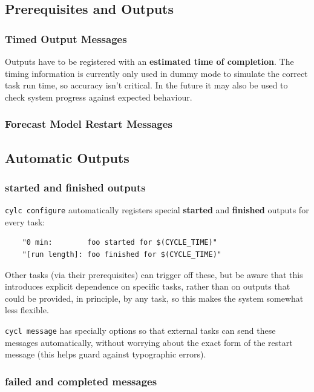 \documentclass[11pt,a4paper]{article}
\begin{document}
\pagebreak
\subsection{Prerequisites and Outputs} 
\label{PrerequisitesandOutputs}

\subsubsection{Timed Output Messages}

Outputs have to be registered with an {\bf estimated time of completion}.
The timing information is currently only used in dummy mode to simulate
the correct task run time, so accuracy isn't critical. In the future
it may also be used to check system progress against expected behaviour.


\subsubsection{Forecast Model Restart Messages}

\subsection{Automatic Outputs}

\subsubsection{started and finished outputs}

\lstinline=cylc configure= automatically registers special {\bf started}
and {\bf finished} outputs for every task: 

\begin{lstlisting}
    "0 min:        foo started for $(CYCLE_TIME)"
    "[run length]: foo finished for $(CYCLE_TIME)"
\end{lstlisting}

Other tasks (via their prerequisites) can trigger off these, but 
be aware that this introduces explicit dependence on specific tasks,
rather than on outputs that could be provided, in principle, by any
task, so this makes the system somewhat less flexible.

\lstinline=cycl message= has specially options so that external tasks
can send these messages automatically, without worrying about the exact
form of the restart message (this helps guard against typographic
errors).


\subsubsection{failed and completed messages}
\end{document}
